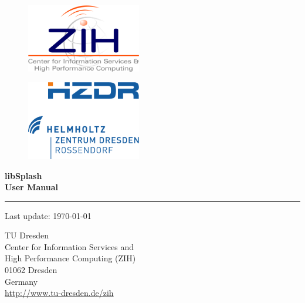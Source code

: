 \documentclass[a4paper,10pt,BCOR12mm]{report}
\begin{document}
\thispagestyle{empty}

\begin{figure}[ht]
\begin{minipage}[b]{0.45\linewidth}
	\centering
	\noindent\includegraphics[width=5cm]{zih_logo}\\
\end{minipage}
\hspace{0.05\linewidth}
\begin{minipage}[b]{0.45\linewidth}
	\centering
	\noindent\includegraphics[width=5cm]{hzdr_logo}\\
\end{minipage}
\end{figure}

\vspace{1cm}

{\bfseries\Huge
\noindent
libSplash \\[.5cm]
User Manual\\
\rule{0pt}{0.75cm}\rule{\textwidth}{1pt}
}

{\centering
Last update: \today
}

\vspace{1cm}

{\noindent}TU Dresden\\
Center for Information Services and \\High Performance Computing (ZIH)\\
01062 Dresden\\
Germany\\[1ex]
\url{http://www.tu-dresden.de/zih}\\
\end{document}
